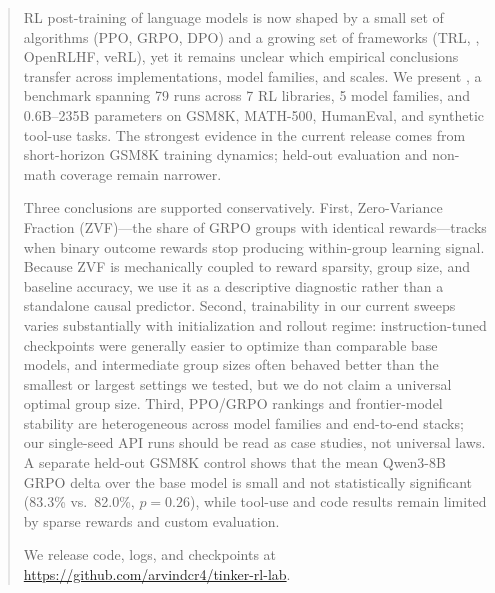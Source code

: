 \begin{abstract}
RL post-training of language models is now shaped by a small set of
algorithms (PPO, GRPO, DPO) and a growing set of frameworks (TRL,
\tinker{}, OpenRLHF, veRL), yet it remains unclear which empirical conclusions
transfer across implementations, model families, and scales. We present
\ours{}, a benchmark spanning 79 runs across 7 RL libraries, 5 model
families, and 0.6B--235B parameters on GSM8K, MATH-500, HumanEval, and
synthetic tool-use tasks. The strongest evidence in the current release comes
from short-horizon GSM8K training dynamics; held-out evaluation and non-math
coverage remain narrower.

Three conclusions are supported conservatively. First, Zero-Variance Fraction
(ZVF)---the share of GRPO groups with identical rewards---tracks when binary
outcome rewards stop producing within-group learning signal. Because ZVF is
mechanically coupled to reward sparsity, group size, and baseline accuracy, we
use it as a descriptive diagnostic rather than a standalone causal predictor.
Second, trainability in our current sweeps varies substantially with
initialization and rollout regime: instruction-tuned checkpoints were
generally easier to optimize than comparable base models, and intermediate
group sizes often behaved better than the smallest or largest settings we
tested, but we do not claim a universal optimal group size. Third, PPO/GRPO
rankings and frontier-model stability are heterogeneous across model families
and end-to-end stacks; our single-seed API runs should be read as case studies,
not universal laws. A separate held-out GSM8K control shows that the mean
Qwen3-8B GRPO delta over the base model is small and not statistically
significant (83.3\% vs.\ 82.0\%, $p{=}0.26$), while tool-use and code results
remain limited by sparse rewards and custom evaluation.

We release code, logs, and checkpoints at
\url{https://github.com/arvindcr4/tinker-rl-lab}.
\end{abstract}
